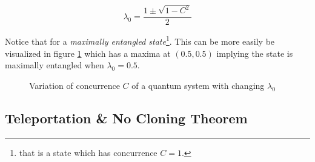 \documentclass[reprint, amsmath,amssymb, aps]{revtex4-2}
\begin{document}
                \begin{equation} \label{eqn:schmidtt-2}
                    \lambda_0 = \frac{1\pm\sqrt{1-C^2}}{2}
                \end{equation}

                Notice that for a \textit{maximally entangled state}\footnote{that is a state which has concurrence $C=1$.}. This can be more easily be visualized in figure \ref{fig:schmidtt-graph} which has a maxima at $(0.5,0.5)$ implying the state is maximally entangled when $\lambda_0 = 0.5$.

                \begin{figure}
                    \centering
                    \caption{Variation of concurrence $C$ of a quantum system with changing $\lambda_0$}
                    \label{fig:schmidtt-graph}
                \end{figure}

                

        \subsection{Teleportation \& No Cloning Theorem}
\end{document}

